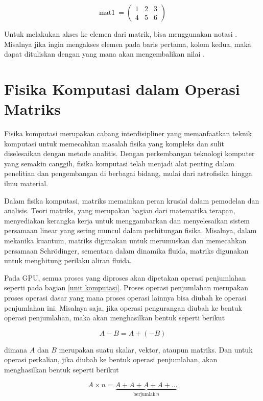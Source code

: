 \begin{equation}
  \text{mat1}\ = \left(
  \begin{matrix}
    1 & 2 & 3 \\
    4 & 5 & 6
  \end{matrix}
  \right)
\end{equation}

\noindent
Untuk melakukan akses ke elemen dari matrik, bisa menggunakan notasi .
Misalnya jika ingin mengakses elemen pada baris pertama, kolom kedua, maka dapat
dituliskan dengan  yang mana akan mengembalikan nilai .

\section{Fisika Komputasi dalam Operasi Matriks}

Fisika komputasi merupakan cabang interdisipliner yang memanfaatkan teknik komputasi
untuk memecahkan masalah fisika yang kompleks dan sulit diselesaikan dengan metode
analitis. Dengan perkembangan teknologi komputer yang semakin canggih, fisika komputasi
telah menjadi alat penting dalam penelitian dan pengembangan di berbagai bidang,
mulai dari astrofisika hingga ilmu material.

Dalam fisika komputasi, matriks memainkan peran krusial dalam pemodelan dan analisis.
Teori matriks, yang merupakan bagian dari matematika terapan, menyediakan
kerangka kerja untuk menggambarkan dan menyelesaikan sistem persamaan linear
yang sering muncul dalam perhitungan fisika. Misalnya, dalam mekanika kuantum, matriks
digunakan untuk merumuskan dan memecahkan persamaan Schrödinger, sementara dalam
dinamika fluida, matriks digunakan untuk menghitung perilaku aliran fluida.

Pada GPU, semua proses yang diproses akan dipetakan operasi penjumlahan seperti
pada bagian \ref{unit komputasi}. Proses operasi penjumlahan merupakan proses operasi
dasar yang mana proses operasi lainnya bisa diubah ke operasi penjumlahan ini.
Misalnya saja, jika operasi pengurangan diubah ke bentuk operasi penjumlahan,
maka akan menghasilkan bentuk seperti berikut

\[
  A - B = A + (-B)
\]

\noindent
dimana $A$ dan $B$ merupakan suatu skalar, vektor, ataupun matriks. Dan untuk operasi
perkalian, jika diubah ke bentuk operasi penjumlahan, akan menghasilkan bentuk seperti
berikut

\[
  A \times n = \underbrace{A + A + A + A + ...}_{\text{berjumlah}\, n}
\]

